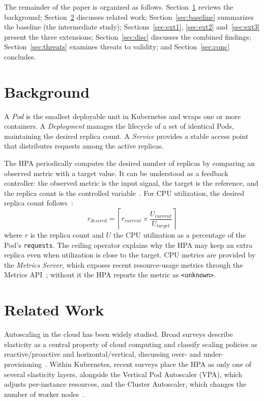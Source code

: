 \documentclass[conference]{IEEEtran}
\begin{document}
The remainder of the paper is organized as follows. Section~\ref{sec:bg} reviews
the background; Section~\ref{sec:rel} discusses related work;
Section~\ref{sec:baseline} summarizes the baseline (the intermediate study);
Sections~\ref{sec:ext1}, \ref{sec:ext2} and~\ref{sec:ext3} present the three
extensions; Section~\ref{sec:disc} discusses the combined findings;
Section~\ref{sec:threats} examines threats to validity; and
Section~\ref{sec:conc} concludes.

\section{Background}
\label{sec:bg}
A \emph{Pod} is the smallest deployable unit in Kubernetes and wraps one or more
containers. A \emph{Deployment} manages the lifecycle of a set of identical Pods,
maintaining the desired replica count. A \emph{Service} provides a stable access
point that distributes requests among the active replicas.

The HPA periodically computes the desired number of replicas by comparing an
observed metric with a target value. It can be understood as a feedback
controller: the observed metric is the input signal, the target is the reference,
and the replica count is the controlled variable~\cite{nguyen2020}. For CPU
utilization, the desired replica count follows~\cite{k8s-hpa-doc}:
\begin{equation}
r_{desired} = \left\lceil r_{current} \times
\frac{U_{current}}{U_{target}} \right\rceil
\label{eq:hpa}
\end{equation}
where $r$ is the replica count and $U$ the CPU utilization as a percentage of the
Pod's \texttt{requests}. The ceiling operator explains why the HPA may keep an
extra replica even when utilization is close to the target. CPU metrics are
provided by the \emph{Metrics Server}, which exposes recent resource-usage
metrics through the Metrics API~\cite{metrics-server}; without it the HPA reports
the metric as \texttt{<unknown>}.

\section{Related Work}
\label{sec:rel}
Autoscaling in the cloud has been widely studied. Broad surveys describe
elasticity as a central property of cloud computing and classify scaling policies
as reactive/proactive and horizontal/vertical, discussing over- and
under-provisioning~\cite{catillo2022,galante2012,lorido2014}. Within Kubernetes,
recent surveys place the HPA as only one of several elasticity layers, alongside
the Vertical Pod Autoscaler (VPA), which adjusts per-instance resources, and the
Cluster Autoscaler, which changes the number of worker
nodes~\cite{survey-k8s-2022,aggarwal2025}.
\end{document}

